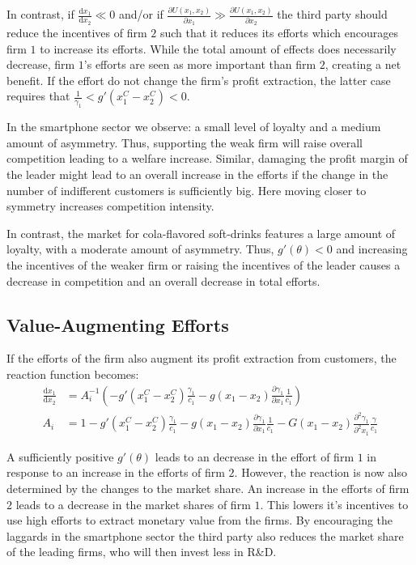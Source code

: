 \documentclass[a4paper, 11pt]{article}
\renewcommand{\d}{\text{d}}
\begin{document}
In contrast, if $\frac{\d x_1}{\d x_2}\ll0$ and/or if $\frac{\partial U(x_1,x_2)}{\partial x_1}\gg \frac{\partial U(x_1,x_2)}{\partial x_2}$ the third party should reduce the incentives of firm $2$ such that it reduces its efforts which encourages firm $1$ to increase its efforts. While the total amount of effects does necessarily decrease, firm $1$'s efforts are seen as more important than firm $2$, creating a net benefit. If the effort do not change the firm's profit extraction, the latter case requires that $\frac{1}{\gamma_1}<g'(x_1^C-x_2^C)<0$.

In the smartphone sector we observe: a small level of loyalty and a medium amount of asymmetry. Thus, supporting the weak firm will raise overall competition leading to a welfare increase. Similar, damaging the profit margin of the leader might lead to an overall increase in the efforts if the change in the number of indifferent customers is sufficiently big. Here moving closer to symmetry increases competition intensity.

In contrast, the market for cola-flavored soft-drinks features a large amount of loyalty, with a moderate amount of asymmetry. Thus, $g'(\theta)<0$ and increasing the incentives of the weaker firm or raising the incentives of the leader causes a decrease in competition and an overall decrease in total efforts.

\subsection{Value-Augmenting Efforts}
If the efforts of the firm also augment its profit extraction from customers, the reaction function becomes:
\begin{align}
\frac{\d x_1}{\d x_2} &= A_i^{-1} \left(-g'(x_1^C-x_2^C)\frac{\gamma_1}{c_1} - g(x_1-x_2)\frac{\partial \gamma_1}{\partial x_1}\frac{1}{c_1}\right)\\
A_i &= 1 - g'(x_1^C-x_2^C)\frac{\gamma_1}{c_1}-g(x_1-x_2)\frac{\partial \gamma_1}{\partial x_1}\frac{1}{c_1}-G(x_1-x_2)\frac{\partial^2 \gamma_1}{\partial^2 x_1}\frac{\gamma}{c_1}
\end{align}

A sufficiently positive $g'(\theta)$ leads to an decrease in the effort of firm $1$ in response to an increase in the efforts of firm $2$. However, the reaction is now also determined by the changes to the market share. An increase in the efforts of firm $2$ leads to a decrease in the market shares of firm $1$. This lowers it's incentives to use high efforts to extract monetary value from the firms. By encouraging the laggards in the smartphone sector the third party also reduces the market share of the leading firms, who will then invest less in R\&D.
\end{document}
